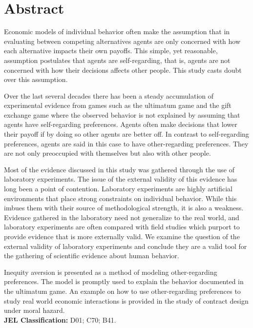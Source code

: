 \documentclass[12pt]{article}
\begin{document}
\section*{Abstract}
Economic models of individual behavior often make the assumption that in evaluating between competing alternatives agents are only concerned with how each alternative impacts their own payoffs. This simple, yet reasonable, assumption postulates that agents are self-regarding, that is, agents are not concerned with how their decisions affects other people. This study casts doubt over this assumption. 

Over the last several decades there has been a steady accumulation of experimental evidence from games such as the ultimatum game and the gift exchange game where the observed behavior is not explained by assuming that agents have self-regarding preferences. Agents often make decisions that lower their payoff if by doing so other agents are better off. In contrast to self-regarding preferences, agents are said in this case to have other-regarding preferences. They are not only preoccupied with themselves but also with other people. 

Most of the evidence discussed in this study was gathered through the use of laboratory experiments. The issue of the external validity of this evidence has long been a point of contention. Laboratory experiments are highly artificial environments that place strong constraints on individual behavior. While this imbues them with their source of methodological strength, it is also a weakness. Evidence gathered in the laboratory need not generalize to the real world, and laboratory experiments are often compared with field studies which purport to provide evidence that is more externally valid. We examine the question of the external validity of laboratory experiments and conclude they are a valid tool for the gathering of scientific evidence about human behavior. 

Inequity aversion is presented as a method of modeling other-regarding preferences. The model is promptly used to explain the behavior documented in the ultimatum game. An example on how to use other-regarding preferences to study real world economic interactions is provided in the study of contract design under moral hazard.
\\

\noindent
\textbf{JEL Classification:} D01; C70; B41.
	
\end{document}
